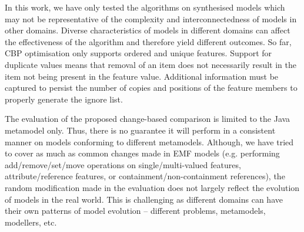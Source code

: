 In this work, we have only tested the algorithms on synthesised  models which may not be representative of the complexity and interconnectedness of models in other domains. Diverse characteristics of models in different domains can affect the effectiveness of the algorithm and therefore yield different outcomes. So far, CBP optimisation only supports ordered and unique features. Support for duplicate values means that removal of an item does not necessarily result in the item not being present in the feature value. Additional information must be captured to persist the number of copies and positions of the feature members to properly generate the ignore list. 

The evaluation of the proposed change-based comparison is limited to the Java metamodel only. Thus, there is no guarantee it will perform in a consistent manner on models conforming to different metamodels. Although, we have tried to cover as much as common changes made in EMF models (e.g. performing \textsf{add}/\textsf{remove}/\textsf{set}/\textsf{move} operations on \textsf{single}/\textsf{multi}-\textsf{valued} features, \textsf{attribute}/\textsf{reference} features, or \textsf{containment}/\textsf{non}-\textsf{containment} references), the random modification made in the evaluation does not largely reflect the evolution of models in the real world. This is challenging as different domains can have their own patterns of model evolution -- different problems, metamodels, modellers, etc.
